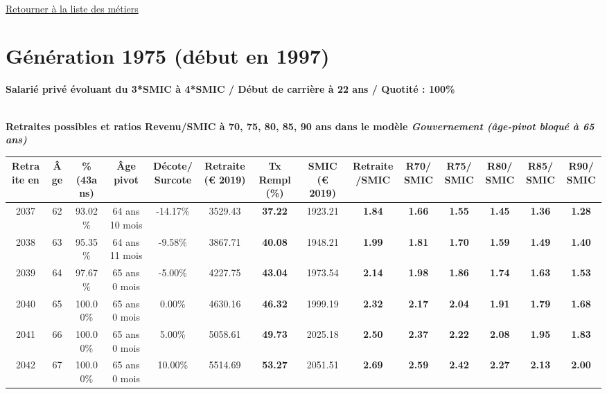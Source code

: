 

   
 \localtableofcontents 

~\\ 
 
 \hyperlink{page.2}{\noindent Retourner à la liste des métiers}

 \newpage 

\section{Génération 1975 (début en 1997)\label{Ascendant45_100_22_1975_0}} 
 
{\bf \noindent Salarié privé évoluant du 3*SMIC à 4*SMIC / Début de carrière à 22 ans / Quotité : 100\%}  ~ 

 ~\\{\bf \noindent Retraites possibles et ratios Revenu/SMIC à 70, 75, 80, 85, 90 ans dans le modèle \emph{Gouvernement (âge-pivot bloqué à 65 ans)}}  
 
\begin{adjustbox}{max width=\textwidth} 
\begin{tabular}[htb]{|c|c||c|c|c||c|c||c|c||c|c|c|c|c|} 
\hline 
 Retraite en &  Âge &  \%(43ans) &  Âge pivot &  Décote/Surcote &  Retraite (\euro{} 2019) &  Tx Rempl(\%) &  SMIC (\euro{} 2019) &  Retraite/SMIC &  R70/SMIC &  R75/SMIC &  R80/SMIC &  R85/SMIC &  R90/SMIC \\ 
\hline \hline 
 2037 &  62 &  93.02\% &  64 ans 10 mois &  -14.17\% &  3529.43 &  {\bf 37.22} &  1923.21 &  {\bf 1.84} &  {\bf 1.66} &  {\bf 1.55} &  {\bf 1.45} &  {\bf 1.36} &  {\bf 1.28} \\ 
\hline 
 2038 &  63 &  95.35\% &  64 ans 11 mois &  -9.58\% &  3867.71 &  {\bf 40.08} &  1948.21 &  {\bf 1.99} &  {\bf 1.81} &  {\bf 1.70} &  {\bf 1.59} &  {\bf 1.49} &  {\bf 1.40} \\ 
\hline 
 2039 &  64 &  97.67\% &  65 ans 0 mois &  -5.00\% &  4227.75 &  {\bf 43.04} &  1973.54 &  {\bf 2.14} &  {\bf 1.98} &  {\bf 1.86} &  {\bf 1.74} &  {\bf 1.63} &  {\bf 1.53} \\ 
\hline 
 2040 &  65 &  100.00\% &  65 ans 0 mois &  0.00\% &  4630.16 &  {\bf 46.32} &  1999.19 &  {\bf 2.32} &  {\bf 2.17} &  {\bf 2.04} &  {\bf 1.91} &  {\bf 1.79} &  {\bf 1.68} \\ 
\hline 
 2041 &  66 &  100.00\% &  65 ans 0 mois &  5.00\% &  5058.61 &  {\bf 49.73} &  2025.18 &  {\bf 2.50} &  {\bf 2.37} &  {\bf 2.22} &  {\bf 2.08} &  {\bf 1.95} &  {\bf 1.83} \\ 
\hline 
 2042 &  67 &  100.00\% &  65 ans 0 mois &  10.00\% &  5514.69 &  {\bf 53.27} &  2051.51 &  {\bf 2.69} &  {\bf 2.59} &  {\bf 2.42} &  {\bf 2.27} &  {\bf 2.13} &  {\bf 2.00} \\ 
\hline 
\hline 
\end{tabular} 
\end{adjustbox} 
 
